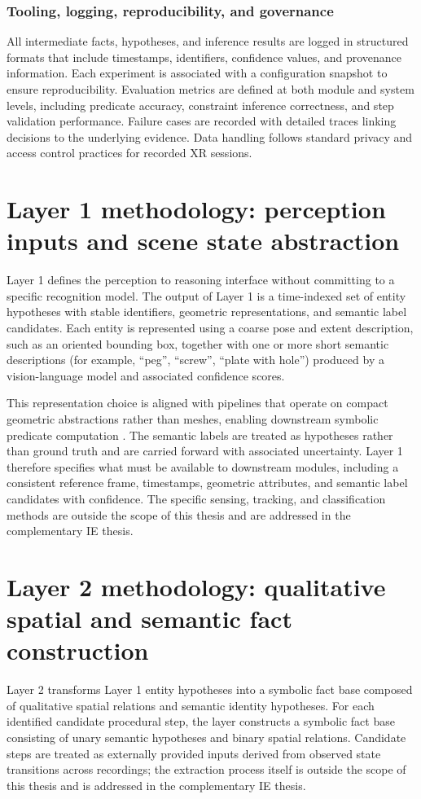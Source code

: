 \documentclass[11pt,titlepage,openright]{book}
\begin{document}
\subsubsection{Tooling, logging, reproducibility, and governance}
\label{sec:tooling-logging}
All intermediate facts, hypotheses, and inference results are logged in structured formats that include timestamps, identifiers, confidence values, and provenance information. Each experiment is associated with a configuration snapshot to ensure reproducibility. Evaluation metrics are defined at both module and system levels, including predicate accuracy, constraint inference correctness, and step validation performance. Failure cases are recorded with detailed traces linking decisions to the underlying evidence. Data handling follows standard privacy and access control practices for recorded XR sessions.




\section{Layer 1 methodology: perception inputs and scene state abstraction}
\label{sec:layer1-method}
Layer 1 defines the perception to reasoning interface without committing to a specific recognition model. The output of Layer 1 is a time-indexed set of entity hypotheses with stable identifiers, geometric representations, and semantic label candidates. Each entity is represented using a coarse pose and extent description, such as an oriented bounding box, together with one or more short semantic descriptions (for example, ``peg'', ``screw'', ``plate with hole'') produced by a vision-language model and associated confidence scores.

This representation choice is aligned with pipelines that operate on compact geometric abstractions rather than meshes, enabling downstream symbolic predicate computation \citep{Haesler_2025}. The semantic labels are treated as hypotheses rather than ground truth and are carried forward with associated uncertainty. Layer 1 therefore specifies what must be available to downstream modules, including a consistent reference frame, timestamps, geometric attributes, and semantic label candidates with confidence. The specific sensing, tracking, and classification methods are outside the scope of this thesis and are addressed in the complementary IE thesis.

\section{Layer 2 methodology: qualitative spatial and semantic fact construction}
\label{sec:layer2-method}
Layer 2 transforms Layer 1 entity hypotheses into a symbolic fact base composed of qualitative spatial relations and semantic identity hypotheses. For each identified candidate procedural step, the layer constructs a symbolic fact base consisting of unary semantic hypotheses and binary spatial relations. Candidate steps are treated as externally provided inputs derived from observed state transitions across recordings; the extraction process itself is outside the scope of this thesis and is addressed in the complementary IE thesis.
\end{document}
